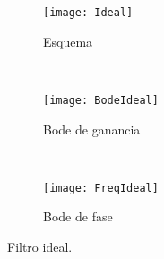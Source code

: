 %
\begin{figure}[h]
    \centering
    \begin{subfigure}[t]{0.32\textwidth}
        \texttt{[image: Ideal]}
        \caption{Esquema}
        \label{subfig:filtroideal_diagrama}
    \end{subfigure}
    ~ %
    \begin{subfigure}[t]{0.32\textwidth}
        \texttt{[image: BodeIdeal]}
        \caption{Bode de ganancia}
        \label{subfig:filtroideal_amplitud}
    \end{subfigure}
    ~ %
    \begin{subfigure}[t]{0.32\textwidth}
        \texttt{[image: FreqIdeal]}
        \caption{Bode de fase}
        \label{subfig:filtroideal_frecuencia}
    \end{subfigure}
    \caption{Filtro ideal.}\label{fig:filtroideal}
\end{figure}

